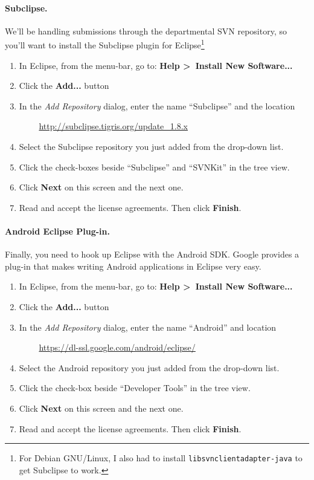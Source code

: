 \documentclass[10pt]{article}
\begin{document}
\paragraph{Subclipse.} We'll be handling submissions through the departmental SVN repository, so you'll
want to install the Subclipse plugin for Eclipse\footnote{For Debian GNU/Linux, I also had to install {\tt libsvnclientadapter-java} to get Subclipse to work.}

\begin{enumerate}
\item In Eclipse, from the menu-bar, go to: \textbf{Help \textgreater~Install New Software...}
\item Click the \textbf{Add...} button
\item In the \textit{Add Repository} dialog, enter the name ``Subclipse'' and the location

$\qquad$ \url{http://subclipse.tigris.org/update_1.8.x}
\item Select the Subclipse repository you just added from the drop-down list.
\item Click the check-boxes beside ``Subclipse'' and ``SVNKit'' in the tree view.
\item Click \textbf{Next} on this screen and the next one.
\item Read and accept the license agreements. Then click  \textbf{Finish}.
\end{enumerate}


\paragraph{Android Eclipse Plug-in.}
Finally, you need to hook up Eclipse with the Android SDK. Google
provides a plug-in that makes writing Android applications in Eclipse very easy.

\begin{enumerate}
\item In Eclipse, from the menu-bar, go to: \textbf{Help \textgreater~Install New Software...}
\item Click the \textbf{Add...} button
\item In the \textit{Add Repository} dialog, enter the name ``Android'' and location

$\qquad$ \url{https://dl-ssl.google.com/android/eclipse/}
\item Select the Android repository you just added from the drop-down list.
\item Click the check-box beside ``Developer Tools'' in the tree view.
\item Click \textbf{Next} on this screen and the next one.
\item Read and accept the license agreements. Then click  \textbf{Finish}.
\end{enumerate}
\end{document}
